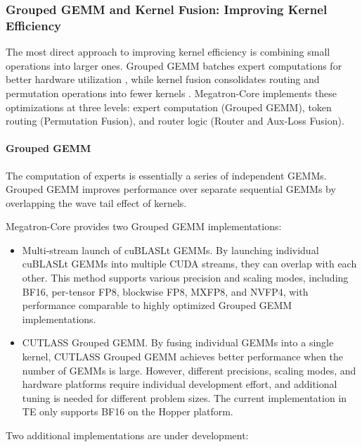 \subsubsection{Grouped GEMM and Kernel Fusion: Improving Kernel Efficiency}\label{sec:kernel-fusion}

The most direct approach to improving kernel efficiency is combining small operations into larger ones. Grouped GEMM batches expert computations for better hardware utilization \cite{megablocks}, while kernel fusion consolidates routing and permutation operations into fewer kernels \cite{chen2018tvm}. Megatron-Core implements these optimizations at three levels: expert computation (Grouped GEMM), token routing (Permutation Fusion), and router logic (Router and Aux-Loss Fusion).

\paragraph{Grouped GEMM}\label{sec:grouped-gemm}

The computation of experts is essentially a series of independent GEMMs. Grouped GEMM improves performance over separate sequential GEMMs by overlapping the wave tail effect of kernels.

Megatron-Core provides two Grouped GEMM implementations:

\begin{itemize}
\item[i.] Multi-stream launch of cuBLASLt GEMMs.
By launching individual cuBLASLt GEMMs into multiple CUDA streams, they can overlap with each other. This method supports various precision and scaling modes, including BF16, per-tensor FP8, blockwise FP8, MXFP8, and NVFP4, with performance comparable to highly optimized Grouped GEMM implementations.

\item[ii.]\label{gmm:2} CUTLASS Grouped GEMM.
By fusing individual GEMMs into a single kernel, CUTLASS Grouped GEMM achieves better performance when the number of GEMMs is large. However, different precisions, scaling modes, and hardware platforms require individual development effort, and additional tuning is needed for different problem sizes. The current implementation in TE only supports BF16 on the Hopper platform.
\end{itemize}


Two additional implementations are under development:

